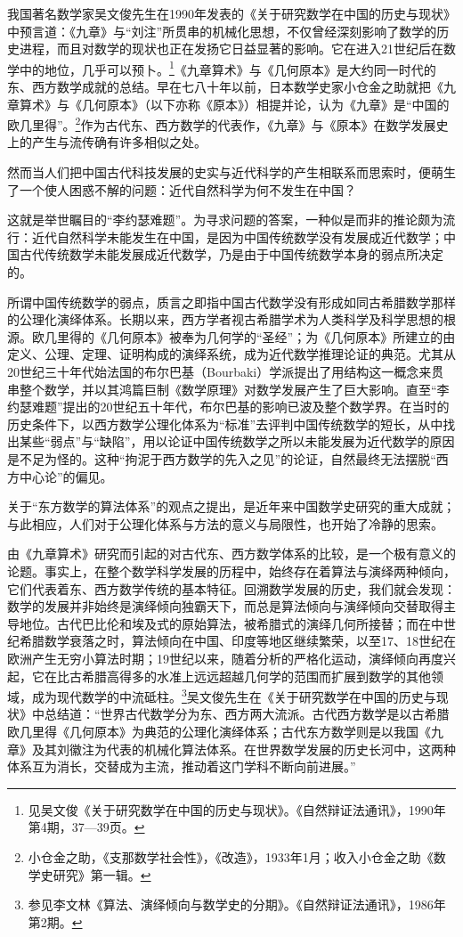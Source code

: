\documentclass[a4paper,12pt,UTF8,twoside]{ctexbook}
\begin{document}
我国著名数学家吴文俊先生在1990年发表的《关于研究数学在中国的历史与现状》中预言道：《九章》与“刘注”所贯串的机械化思想，不仅曾经深刻影响了数学的历史进程，而且对数学的现状也正在发扬它日益显著的影响。它在进入21世纪后在数学中的地位，几乎可以预卜。\footnote{见吴文俊《关于研究数学在中国的历史与现状》。《自然辩证法通讯》，1990年第4期，37—39页。}《九章算术》与《几何原本》是大约同一时代的东、西方数学成就的总结。早在七八十年以前，日本数学史家小仓金之助就把《九章算术》与《几何原本》（以下亦称《原本》）相提并论，认为《九章》是“中国的欧几里得”。\footnote{小仓金之助，《支那数学社会性》，《改造》，1933年1月；收入小仓金之助《数学史研究》第一辑。}作为古代东、西方数学的代表作，《九章》与《原本》在数学发展史上的产生与流传确有许多相似之处。

然而当人们把中国古代科技发展的史实与近代科学的产生相联系而思索时，便萌生了一个使人困惑不解的问题：近代自然科学为何不发生在中国？

这就是举世瞩目的“李约瑟难题”。为寻求问题的答案，一种似是而非的推论颇为流行：近代自然科学未能发生在中国，是因为中国传统数学没有发展成近代数学；中国古代传统数学未能发展成近代数学，乃是由于中国传统数学本身的弱点所决定的。

所谓中国传统数学的弱点，质言之即指中国古代数学没有形成如同古希腊数学那样的公理化演绎体系。长期以来，西方学者视古希腊学术为人类科学及科学思想的根源。欧几里得的《几何原本》被奉为几何学的“圣经”；为《几何原本》所建立的由定义、公理、定理、证明构成的演绎系统，成为近代数学推理论证的典范。尤其从20世纪三十年代始法国的布尔巴基（Bourbaki）学派提出了用结构这一概念来贯串整个数学，并以其鸿篇巨制《数学原理》对数学发展产生了巨大影响。直至“李约瑟难题”提出的20世纪五十年代，布尔巴基的影响已波及整个数学界。在当时的历史条件下，以西方数学公理化体系为“标准”去评判中国传统数学的短长，从中找出某些“弱点”与“缺陷”，用以论证中国传统数学之所以未能发展为近代数学的原因是不足为怪的。这种“拘泥于西方数学的先入之见”的论证，自然最终无法摆脱“西方中心论”的偏见。

关于“东方数学的算法体系”的观点之提出，是近年来中国数学史研究的重大成就；与此相应，人们对于公理化体系与方法的意义与局限性，也开始了冷静的思索。

由《九章算术》研究而引起的对古代东、西方数学体系的比较，是一个极有意义的论题。事实上，在整个数学科学发展的历程中，始终存在着算法与演绎两种倾向，它们代表着东、西方数学传统的基本特征。回溯数学发展的历史，我们就会发现：数学的发展并非始终是演绎倾向独霸天下，而总是算法倾向与演绎倾向交替取得主导地位。古代巴比伦和埃及式的原始算法，被希腊式的演绎几何所接替；而在中世纪希腊数学衰落之时，算法倾向在中国、印度等地区继续繁荣，以至17、18世纪在欧洲产生无穷小算法时期；19世纪以来，随着分析的严格化运动，演绎倾向再度兴起，它在比古希腊高得多的水准上远远超越几何学的范围而扩展到数学的其他领域，成为现代数学的中流砥柱。\footnote{参见李文林《算法、演绎倾向与数学史的分期》。《自然辩证法通讯》，1986年第2期。}吴文俊先生在《关于研究数学在中国的历史与现状》中总结道：“世界古代数学分为东、西方两大流派。古代西方数学是以古希腊欧几里得《几何原本》为典范的公理化演绎体系；古代东方数学则是以我国《九章》及其刘徽注为代表的机械化算法体系。在世界数学发展的历史长河中，这两种体系互为消长，交替成为主流，推动着这门学科不断向前进展。”
\end{document}
